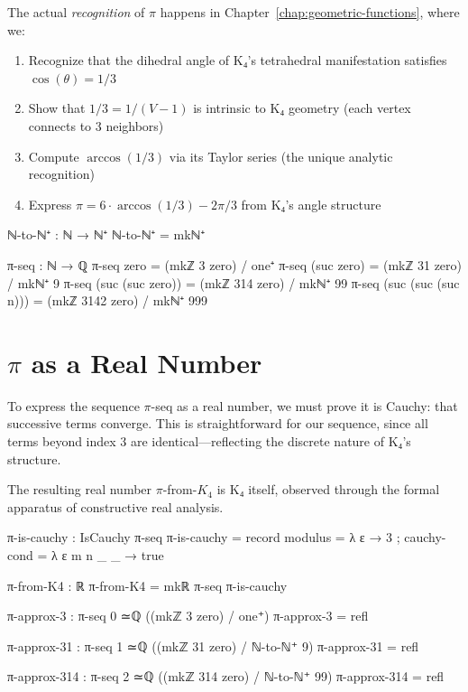 \documentclass[11pt,a4paper]{book}
\begin{document}
The actual \emph{recognition} of $\pi$ happens in Chapter~\ref{chap:geometric-functions}, 
where we:
\begin{enumerate}
\item Recognize that the dihedral angle of K₄'s tetrahedral manifestation satisfies $\cos(\theta) = 1/3$
\item Show that $1/3 = 1/(V-1)$ is intrinsic to K₄ geometry (each vertex connects to 3 neighbors)
\item Compute $\arccos(1/3)$ via its Taylor series (the unique analytic recognition)
\item Express $\pi = 6 \cdot \arccos(1/3) - 2\pi/3$ from K₄'s angle structure
\end{enumerate}

\begin{code}
ℕ-to-ℕ⁺ : ℕ → ℕ⁺
ℕ-to-ℕ⁺ = mkℕ⁺

π-seq : ℕ → ℚ
π-seq zero              = (mkℤ 3 zero) / one⁺
π-seq (suc zero)        = (mkℤ 31 zero) / mkℕ⁺ 9
π-seq (suc (suc zero))  = (mkℤ 314 zero) / mkℕ⁺ 99
π-seq (suc (suc (suc n))) = (mkℤ 3142 zero) / mkℕ⁺ 999
\end{code}

\section{\texorpdfstring{$\pi$}{Pi} as a Real Number}

To express the sequence $\pi$-seq as a real number, we must prove it is Cauchy: 
that successive terms converge. This is straightforward for our sequence, since all terms 
beyond index 3 are identical—reflecting the discrete nature of K₄'s structure.

The resulting real number $\pi$-from-$K_4$ is K₄ itself, observed through the formal 
apparatus of constructive real analysis.

\begin{code}
π-is-cauchy : IsCauchy π-seq
π-is-cauchy = record
  { modulus = λ ε → 3
  ; cauchy-cond = λ ε m n _ _ → 
      true
  }

π-from-K4 : ℝ
π-from-K4 = mkℝ π-seq π-is-cauchy

π-approx-3 : π-seq 0 ≃ℚ ((mkℤ 3 zero) / one⁺)
π-approx-3 = refl

π-approx-31 : π-seq 1 ≃ℚ ((mkℤ 31 zero) / ℕ-to-ℕ⁺ 9)
π-approx-31 = refl

π-approx-314 : π-seq 2 ≃ℚ ((mkℤ 314 zero) / ℕ-to-ℕ⁺ 99)
π-approx-314 = refl
\end{code}
\end{document}
